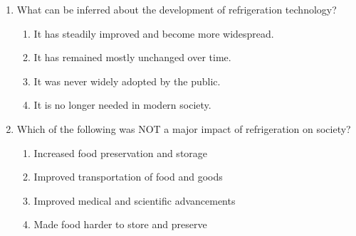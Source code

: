 \documentclass[12pt]{article}
\begin{document}
\begin{enumerate}
    \item What can be inferred about the development of refrigeration technology?
    \begin{enumerate}[label=\Alph*.]
        \item It has steadily improved and become more widespread.
        \item It has remained mostly unchanged over time.
        \item It was never widely adopted by the public.
        \item It is no longer needed in modern society.
    \end{enumerate}
    \vspace{0.5cm}

    \item Which of the following was NOT a major impact of refrigeration on society?
    \begin{enumerate}[label=\Alph*.]
        \item Increased food preservation and storage
        \item Improved transportation of food and goods
        \item Improved medical and scientific advancements
        \item Made food harder to store and preserve
    \end{enumerate}
    \vspace{0.5cm}

\end{enumerate}
\end{document}
